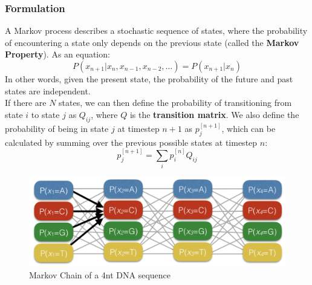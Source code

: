 \documentclass[12pt]{article}
\begin{document}
\subsubsection{Formulation}
A Markov process describes a stochastic sequence of states, where the probability of encountering a state only depends on the previous state (called the \textbf{Markov Property}). As an equation:
$$P(x_{n+1} |x_{n},x_{n-1}, x_{n-2},\ldots) = P(x_{n+1} |x_{n})$$
In other words, given the present state, the probability of the future and past states are independent.\\[10pt] 
If there are $N$ states, we can then define the probability of transitioning from state $i$ to state $j$ as $Q_{ij}$, where $Q$ is the \textbf{transition matrix}. We also define the probability of being in state $j$ at timestep $n+1$ as $p_j^{[n+1]}$, which can be calculated by summing over the previous possible states at timestep $n$:
$$p_j^{[n+1]} = \sum_ip_i^{[n]}Q_{ij}$$
\begin{figure}[ht!]
    \centering
    \includegraphics[width = .7\linewidth]{markov_base.png}
    \caption{Markov Chain of a 4nt DNA sequence}
    \label{fig:markov}
\end{figure}
\end{document}
